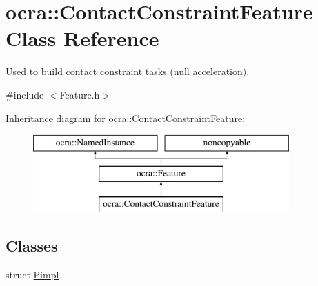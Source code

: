 \hypertarget{classocra_1_1ContactConstraintFeature}{}\section{ocra\+:\+:Contact\+Constraint\+Feature Class Reference}
\label{classocra_1_1ContactConstraintFeature}


Used to build contact constraint tasks (null acceleration).  




{\ttfamily \#include $<$Feature.\+h$>$}

Inheritance diagram for ocra\+:\+:Contact\+Constraint\+Feature\+:\begin{figure}[H]
\begin{center}
\leavevmode
\includegraphics[height=3.000000cm]{d3/dd9/classocra_1_1ContactConstraintFeature}
\end{center}
\end{figure}
\subsection*{Classes}
\begin{DoxyCompactItemize}
\item 
struct \hyperlink{structocra_1_1ContactConstraintFeature_1_1Pimpl}{Pimpl}
\end{DoxyCompactItemize}

